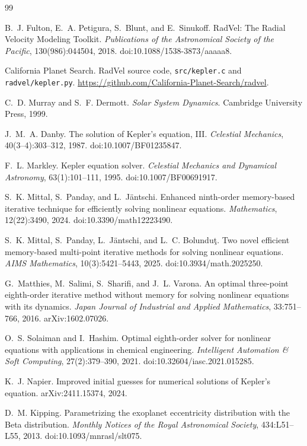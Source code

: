 \documentclass[sigconf,nonacm]{acmart}
\begin{document}
\begin{thebibliography}{99}

B.~J. Fulton, E.~A. Petigura, S.~Blunt, and E.~Sinukoff.
RadVel: The Radial Velocity Modeling Toolkit.
\emph{Publications of the Astronomical Society of the Pacific},
130(986):044504, 2018. doi:10.1088/1538-3873/aaaaa8.

California Planet Search.
RadVel source code, \texttt{src/kepler.c} and \texttt{radvel/kepler.py}.
\url{https://github.com/California-Planet-Search/radvel}.

C.~D. Murray and S.~F. Dermott.
\emph{Solar System Dynamics}.
Cambridge University Press, 1999.

J.~M.~A. Danby.
The solution of Kepler's equation, III.
\emph{Celestial Mechanics}, 40(3--4):303--312, 1987.
doi:10.1007/BF01235847.

F.~L. Markley.
Kepler equation solver.
\emph{Celestial Mechanics and Dynamical Astronomy}, 63(1):101--111, 1995.
doi:10.1007/BF00691917.

S.~K. Mittal, S.~Panday, and L.~J\"antschi.
Enhanced ninth-order memory-based iterative technique for efficiently
solving nonlinear equations.
\emph{Mathematics}, 12(22):3490, 2024. doi:10.3390/math12223490.

S.~K. Mittal, S.~Panday, L.~J\"antschi, and L.~C. Bolundu\c{t}.
Two novel efficient memory-based multi-point iterative methods for solving
nonlinear equations.
\emph{AIMS Mathematics}, 10(3):5421--5443, 2025.
doi:10.3934/math.2025250.

G.~Matthies, M.~Salimi, S.~Sharifi, and J.~L. Varona.
An optimal three-point eighth-order iterative method without memory for
solving nonlinear equations with its dynamics.
\emph{Japan Journal of Industrial and Applied Mathematics}, 33:751--766,
2016. arXiv:1602.07026.

O.~S. Solaiman and I.~Hashim.
Optimal eighth-order solver for nonlinear equations with applications in
chemical engineering.
\emph{Intelligent Automation \& Soft Computing}, 27(2):379--390, 2021.
doi:10.32604/iasc.2021.015285.

K.~J. Napier.
Improved initial guesses for numerical solutions of Kepler's equation.
arXiv:2411.15374, 2024.

D.~M. Kipping.
Parametrizing the exoplanet eccentricity distribution with the Beta
distribution.
\emph{Monthly Notices of the Royal Astronomical Society}, 434:L51--L55,
2013. doi:10.1093/mnrasl/slt075.


\end{thebibliography}
\end{document}
